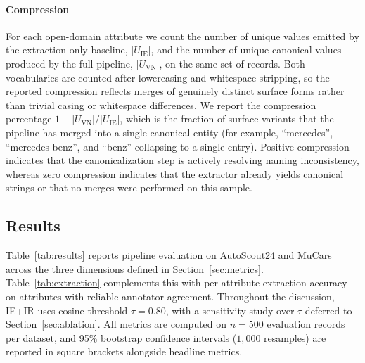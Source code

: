 \documentclass[conference]{IEEEtran}
\begin{document}
\paragraph{Compression}
For each open-domain attribute we count the number of unique values
emitted by the extraction-only baseline, $|U_{\mathrm{IE}}|$, and the
number of unique canonical values produced by the full pipeline,
$|U_{\mathrm{VN}}|$, on the same set of records. Both vocabularies
are counted after lowercasing and whitespace stripping, so the
reported compression reflects merges of genuinely distinct surface
forms rather than trivial casing or whitespace differences. We
report the compression percentage
$1 - |U_{\mathrm{VN}}| / |U_{\mathrm{IE}}|$, which is the fraction
of surface variants that the pipeline has merged into a single
canonical entity (for example, ``mercedes'', ``mercedes-benz'', and
``benz'' collapsing to a single entry). Positive compression
indicates that the canonicalization step is actively resolving
naming inconsistency, whereas zero compression indicates that the
extractor already yields canonical strings or that no merges were
performed on this sample.

\subsection{Results}
\label{sec:results}

Table~\ref{tab:results} reports pipeline evaluation on AutoScout24
and MuCars across the three dimensions defined in
Section~\ref{sec:metrics}. Table~\ref{tab:extraction} complements this
with per-attribute extraction accuracy on attributes with reliable
annotator agreement. Throughout the discussion, IE+IR uses cosine
threshold $\tau = 0.80$, with a sensitivity study over $\tau$
deferred to Section~\ref{sec:ablation}. All metrics are computed on
$n = 500$ evaluation records per dataset, and 95\% bootstrap
confidence intervals ($1{,}000$ resamples) are reported in square
brackets alongside headline metrics.
\end{document}
